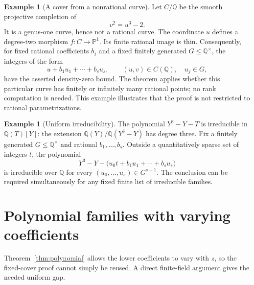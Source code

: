 \documentclass[11pt,a4paper]{article}
\theoremstyle{definition}
\newtheorem{example}[theorem]{Example}
\theoremstyle{remark}
\newcommand{\Q}{\mathbb Q}
\newcommand{\Pone}{\mathbb P^1}
\begin{document}
\begin{example}[A cover from a nonrational curve]
Let $C/\Q$ be the smooth projective completion of
\[
 v^2=u^3-2.
\]
It is a genus-one curve, hence not a rational curve. The coordinate
$u$ defines a degree-two morphism $f:C\to\Pone$. Its finite rational
image is thin. Consequently, for fixed rational coefficients $b_j$ and
a fixed finitely generated $G\le\Q^\times$, the integers of the form
\[
 u+b_1u_1+\cdots+b_su_s,
 \qquad (u,v)\in C(\Q),\quad u_j\in G,
\]
have the asserted density-zero bound. The theorem applies whether this
particular curve has finitely or infinitely many rational points; no
rank computation is needed. This example illustrates that the proof is
not restricted to rational parametrizations.
\end{example}

\begin{example}[Uniform irreducibility]
The polynomial $Y^3-Y-T$ is irreducible in $\Q(T)[Y]$: the extension
$\Q(Y)/\Q(Y^3-Y)$ has degree three. Fix a finitely generated
$G\le\Q^\times$ and rational $b_1,\ldots,b_s$. Outside a quantitatively
sparse set of integers $t$, the polynomial
\[
 Y^3-Y-\bigl(u_0t+b_1u_1+\cdots+b_su_s\bigr)
\]
is irreducible over $\Q$ for every $(u_0,\ldots,u_s)\in G^{s+1}$.
The conclusion can be required simultaneously for any fixed finite
list of irreducible families.
\end{example}

\section{Polynomial families with varying coefficients}

Theorem~\ref{thm:polynomial} allows the lower coefficients to vary with
$z$, so the fixed-cover proof cannot simply be reused. A direct
finite-field argument gives the needed uniform gap.
\end{document}
